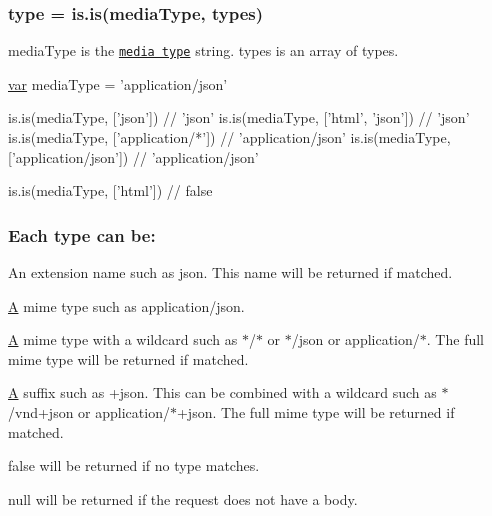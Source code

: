 \subsubsection*{type = is.\+is(media\+Type, types)}

{\ttfamily media\+Type} is the \href{https://tools.ietf.org/html/rfc6838}{\tt media type} string. {\ttfamily types} is an array of types.


\begin{DoxyCode}
\hyperlink{018__def_8c_a335628f2e9085305224b4f9cc6e95ed5}{var} mediaType = \textcolor{stringliteral}{'application/json'}

is.is(mediaType, [\textcolor{stringliteral}{'json'}])             \textcolor{comment}{// 'json'}
is.is(mediaType, [\textcolor{stringliteral}{'html'}, \textcolor{stringliteral}{'json'}])     \textcolor{comment}{// 'json'}
is.is(mediaType, [\textcolor{stringliteral}{'application/*'}])    \textcolor{comment}{// 'application/json'}
is.is(mediaType, [\textcolor{stringliteral}{'application/json'}]) \textcolor{comment}{// 'application/json'}

is.is(mediaType, [\textcolor{stringliteral}{'html'}]) \textcolor{comment}{// false}
\end{DoxyCode}


\subsubsection*{Each type can be\+:}


\begin{DoxyItemize}
\item An extension name such as {\ttfamily json}. This name will be returned if matched.
\item \hyperlink{class_a}{A} mime type such as {\ttfamily application/json}.
\item \hyperlink{class_a}{A} mime type with a wildcard such as {\ttfamily $\ast$/$\ast$} or {\ttfamily $\ast$/json} or {\ttfamily application/$\ast$}. The full mime type will be returned if matched.
\item \hyperlink{class_a}{A} suffix such as {\ttfamily +json}. This can be combined with a wildcard such as {\ttfamily $\ast$/vnd+json} or {\ttfamily application/$\ast$+json}. The full mime type will be returned if matched.
\end{DoxyItemize}

{\ttfamily false} will be returned if no type matches.

{\ttfamily null} will be returned if the request does not have a body.

